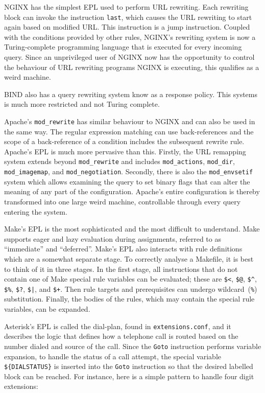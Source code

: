 \documentclass[letterpaper,twocolumn,10pt]{article}
\begin{document}
NGINX has the simplest EPL used to perform URL rewriting. Each rewriting block can invoke the instruction \texttt{last}, which causes the URL rewriting to start again based on modified URL. This instruction is a jump instruction. Coupled with the conditions provided by other rules, NGINX's rewriting system is now a Turing-complete programming language that is executed for every incoming query. Since an unprivileged user of NGINX now has the opportunity to control the behaviour of URL rewriting programs NGINX is executing, this qualifies as a weird machine.

BIND also has a query rewriting system know as a response policy. This systems is much more restricted and not Turing complete.

Apache's \verb!mod_rewrite! has similar behaviour to NGINX and can also be used in the same way. The regular expression matching can use back-references and the scope of a back-reference of a condition includes the subsequent rewrite rule. Apache's EPL is much more pervasive than this. Firstly, the URL remapping system extends beyond \verb!mod_rewrite! and includes \verb!mod_actions!, \verb!mod_dir!, \verb!mod_imagemap!, and \verb!mod_negotiation!. Secondly, there is also the \verb!mod_envsetif! system which allows examining the query to set binary flags that can alter the meaning of any part of the configuration. Apache's entire configuration is thereby transformed into one large weird machine, controllable through every query entering the system.

Make's EPL is the most sophisticated and the most difficult to understand. Make supports eager and lazy evaluation during assignments, referred to as ``immediate'' and ``deferred''. Make's EPL also interacts with rule definitions which are a somewhat separate stage. To correctly analyse a Makefile, it is best to think of it in three stages. In the first stage, all instructions that do not contain one of Make special rule variables can be evaluated; these are \texttt{\$<}, \texttt{\$@}, \texttt{\$\^{}}, \texttt{\$\%}, \texttt{\$?}, \texttt{\$|}, and \texttt{\$+}. Then rule targets and prerequisites can undergo wildcard~(\texttt{\%}) substitution. Finally, the bodies of the rules, which may contain the special rule variables, can be expanded.

Asterisk's EPL is called the dial-plan, found in \texttt{extensions.conf}, and it describes the logic that defines how a telephone call is routed based on the number dialed and source of the call. Since the \texttt{Goto} instruction performs variable expansion, to handle the status of a call attempt, the special variable \texttt{\$\{DIALSTATUS\}} is inserted into the \texttt{Goto} instruction so that the desired labelled block can be reached. For instance, here is a simple pattern to handle four digit extensions:
\end{document}
